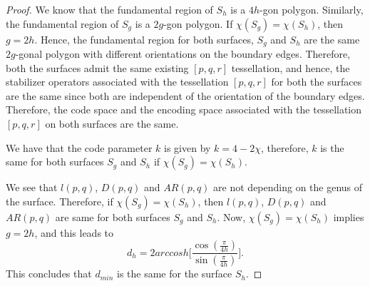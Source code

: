 \documentclass[10pt,a4paper]{amsart}
\begin{document}
\begin{proof}
	We know that the fundamental region of $S_{h}$ is a $4h$-gon polygon. Similarly, the fundamental region of $S_g$ is a $2g$-gon polygon. If $\chi(S_{g}) = \chi(S_{h})$, then $g=2h$. Hence, the fundamental region for both surfaces, $S_g$ and $S_h$ are the same $2g$-gonal polygon with different orientations on the boundary edges. Therefore, both the surfaces admit the same existing $[p,q,r]$ tessellation, and hence, the stabilizer operators associated with the tessellation $[p,q,r]$ for both the surfaces are the same since both are independent of the orientation of the boundary edges. Therefore, the code space and the encoding space associated with the tessellation $[p,q,r]$ on both surfaces are the same.
	
	We have that the code parameter $k$ is given by $k=4-2\chi$, therefore, $k$ is the same for both surfaces $S_g$ and $S_{h}$ if $\chi(S_g)=\chi(S_{h})$.
	
	We see that $l(p,q)$, $D(p,q)$ and $AR(p,q)$ are not depending on the genus of the surface. Therefore, if $\chi(S_g)= \chi(S_{h})$, then $l(p,q)$, $D(p,q)$ and $AR(p,q)$ are same for both surfaces $S_g$ and $S_{h}$. Now, $\chi(S_g)=  \chi(S_{h})$ implies $g=2h$, and this leads to
	\[
	d_h=2arccosh\Bigg[\frac{\cos{(\frac{\pi}{4h})}}{\sin{(\frac{\pi}{4h})}}\bigg].
	\]
	This concludes that $d_{min}$ is the same for the surface $S_{h}$.
\end{proof}
\end{document}
